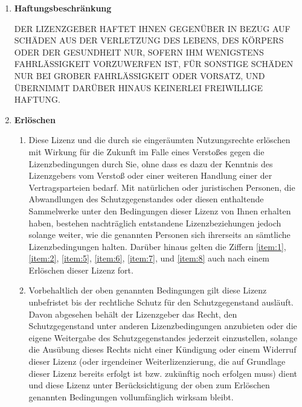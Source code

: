 \begin{enumerate}
  \item \label{item:6} \textbf{Haftungsbeschränkung}

DER LIZENZGEBER HAFTET IHNEN GEGENÜBER IN BEZUG AUF SCHÄDEN AUS DER VERLETZUNG DES LEBENS, DES KÖRPERS ODER DER GESUNDHEIT NUR, SOFERN IHM WENIGSTENS FAHRLÄSSIGKEIT VORZUWERFEN IST, FÜR SONSTIGE SCHÄDEN NUR BEI GROBER FAHRLÄSSIGKEIT ODER VORSATZ, UND ÜBERNIMMT DARÜBER HINAUS KEINERLEI FREIWILLIGE HAFTUNG.

  \item \label{item:7} \textbf{Erlöschen}
    \begin{enumerate}
      \item Diese Lizenz und die durch sie eingeräumten Nutzungsrechte erlöschen mit Wirkung für die Zukunft im Falle eines Verstoßes gegen die Lizenzbedingungen durch Sie, ohne dass es dazu der Kenntnis des Lizenzgebers vom Verstoß oder einer weiteren Handlung einer der Vertragsparteien bedarf. Mit natürlichen oder juristischen Personen, die Abwandlungen des Schutzgegenstandes oder diesen enthaltende Sammelwerke unter den Bedingungen dieser Lizenz von Ihnen erhalten haben, bestehen nachträglich entstandene Lizenzbeziehungen jedoch solange weiter, wie die genannten Personen sich ihrerseits an sämtliche Lizenzbedingungen halten. Darüber hinaus gelten die Ziffern \ref{item:1}, \ref{item:2}, \ref{item:5}, \ref{item:6}, \ref{item:7}, und \ref{item:8} auch nach einem Erlöschen dieser Lizenz fort.
      \item Vorbehaltlich der oben genannten Bedingungen gilt diese Lizenz unbefristet bis der rechtliche Schutz für den Schutzgegenstand ausläuft. Davon abgesehen behält der Lizenzgeber das Recht, den Schutzgegenstand unter anderen Lizenzbedingungen anzubieten oder die eigene Weitergabe des Schutzgegenstandes jederzeit einzustellen, solange die Ausübung dieses Rechts nicht einer Kündigung oder einem Widerruf dieser Lizenz (oder irgendeiner Weiterlizenzierung, die auf Grundlage dieser Lizenz bereits erfolgt ist bzw. zukünftig noch erfolgen muss) dient und diese Lizenz unter Berücksichtigung der oben zum Erlöschen genannten Bedingungen vollumfänglich wirksam bleibt.
    \end{enumerate}


\end{enumerate}
